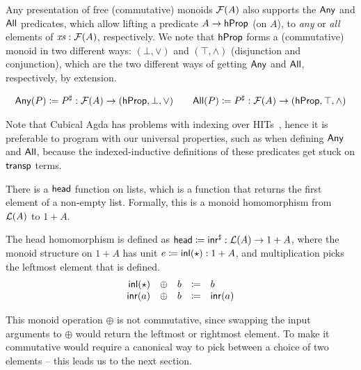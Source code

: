 Any presentation of free (commutative) monoids $\mathcal{F}(A)$ also supports the
$\operatorname{\mathsf{Any}}$ and $\operatorname{\mathsf{All}}$ predicates, which allow lifting a predicate $A \to \mathsf{hProp}$ (on $A$),
to \emph{any} or \emph{all} elements of $\mathit{xs} : \mathcal{F}(A)$, respectively.
%
We note that $\mathsf{hProp}$ forms a (commutative) monoid in two different ways:
$(\bot,\vee)$ and $(\top,\wedge)$ (disjunction and conjunction),
which are the two different ways of getting $\operatorname{\mathsf{Any}}$ and $\operatorname{\mathsf{All}}$,
respectively, by extension.
\begin{definition}
      \label{def:any-all}
      \begin{gather*}
            \mathsf{Any}(P) \mathrel{\coloneq} {P}^{\sharp} : \mathcal{F}(A) \to (\mathsf{hProp}, \bot, \vee)
            \qquad
            \mathsf{All}(P) \mathrel{\coloneq} {P}^{\sharp} : \mathcal{F}(A) \to (\mathsf{hProp}, \top, \wedge)
      \end{gather*}
\end{definition}
%
Note that Cubical Agda has problems with indexing over HITs~\cite[\S~8]{ProperSupportInductive,alexandruIntrinsicallyCorrectSorting2023},
hence it is preferable to program with our universal properties, such as when defining $\operatorname{\mathsf{Any}}$ and $\operatorname{\mathsf{All}}$,
because the indexed-inductive definitions of these predicates get stuck on $\operatorname{\mathsf{transp}}$ terms.

There is a $\operatorname{\mathsf{head}}$ function on lists, which is a function that returns the first element of a non-empty list.
%
Formally, this is a monoid homomorphism from $\mathcal{L}(A)$ to $1 + A$.
%
\begin{definition}
      \label{def:head-free-monoid}
      The head homomorphism is defined as
      \(
      \operatorname{\mathsf{head}} \mathrel{\coloneq} {\operatorname{\mathsf{inr}}}^{\sharp} : \mathcal{L}(A) \to 1 + A
      \),
      where the monoid structure on $1 + A$ has unit
      \(
      e \mathrel{\coloneq} \operatorname{\mathsf{inl}}(\star) : 1 + A
      \),
      and multiplication picks the leftmost element that is defined.
      \[
            \begin{array}{rclcl}
                  \operatorname{\mathsf{inl}}(\star) & \oplus & b & \mathrel{\coloneq} & b       \\
                  \operatorname{\mathsf{inr}}(a)    & \oplus & b & \mathrel{\coloneq} & \operatorname{\mathsf{inr}}(a) \\
            \end{array}
      \]
\end{definition}
%
This monoid operation $\oplus$ is not commutative,
since swapping the input arguments to $\oplus$ would return the leftmost or rightmost element.
%
To make it commutative would require a canonical way to pick between a choice of two elements --
this leads us to the next section.
